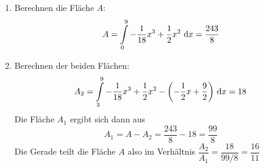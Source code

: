 \begin{Answer}[ref=verhaltnisFlaechenA3]
	\begin{enumerate}[label=\alph*)]
		\item Berechnen die Fläche \(A\):
		\[A=\int\limits_0^9 -\frac{1}{18}x^3+\frac{1}{2}x^2 \ \text{d} x=\frac{243}{8}\]
		\item Berechnen der beiden Flächen:
		\[A_2=\int\limits_3^9 -\frac{1}{18}x^3+\frac{1}{2}x^2-\left(-\frac{1}{2}x+\frac{9}{2}\right) \td x=18\]
		Die Fläche \(A_1\) ergibt sich dann aus
		\[A_1=A-A_2=\frac{243}{8}-18=\frac{99}{8}\]
		Die Gerade teilt die Fläche \(A\) also im Verhältnis \(\dfrac{A_2}{A_1}=\dfrac{18}{99/8}=\dfrac{16}{11}\)
    \end{enumerate}

    \bigskip

\end{Answer}
